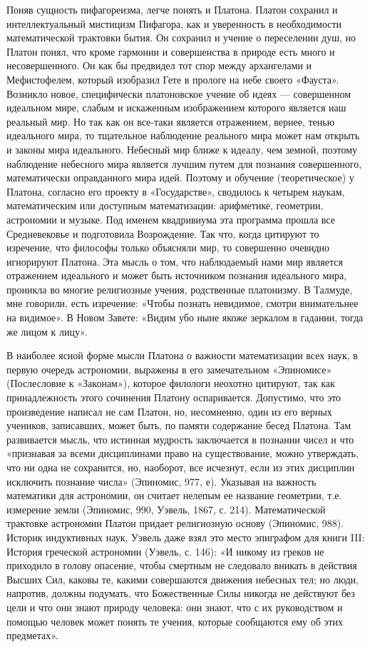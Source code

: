 Поняв сущность пифагореизма, легче понять и Платона. Платон сохранил и
интеллектуальный мистицизм Пифагора, как и уверенность в необходимости
математической  трактовки бытия.  Он сохранил  и учение  о переселении
душ, но Платон понял, что кроме гармонии и совершенства в природе есть
много и несовершенного. Он как бы предвидел тот спор между архангелами
и  Мефистофелем,  который изобразил  Гете  в  прологе на  небе  своего
«Фауста». Возникло  новое, специфически  платоновское учение  об идеях
---  совершенном  идеальном  мире, слабым  и  искаженным  изображением
которого является  наш реальный мир.  Но так как он  все-таки является
отражением, вернее,  тенью идеального  мира, то  тщательное наблюдение
реального мира  может нам открыть  и законы мира  идеального. Небесный
мир  ближе к  идеалу, чем  земной, поэтому  наблюдение небесного  мира
является  лучшим   путем  для  познания   совершенного,  математически
оправданного мира идей. Поэтому  и обучение (теоретическое) у Платона,
согласно  его проекту  в  «Государстве», сводилось  к четырем  наукам,
математическим  или  доступным математизации:  арифметике,  геометрии,
астрономии и музыке.  Под именем квадривиума эта  программа прошла все
Средневековье и  подготовила Возрождение.  Так что, когда  цитируют то
изречение, что  философы только объясняли мир,  то совершенно очевидно
игнорируют Платона. Эта мысль о том, что наблюдаемый нами мир является
отражением  идеального и  может  быть  источником познания  идеального
мира, проникла во многие религиозные учения, родственные платонизму. В
Талмуде,  мне  говорили,  есть изречение:  «Чтобы  познать  невидимое,
смотри внимательнее на видимое». В Новом Завете: «Видим убо ныне якоже
зеркалом в гадании, тогда же лицом к лицу».

В наиболее  ясной форме  мысли Платона  о важности  математизации всех
наук,  в  первую  очередь  астрономии, выражены  в  его  замечательном
«Эпиномисе»  (Послесловие  к  «Законам»),  которое  филологи  неохотно
цитируют, так как принадлежность этого сочинения Платону оспаривается.
Допустимо, что это произведение написал не сам Платон, но, несомненно,
один  из  его  верных  учеников, записавших,  может  быть,  по  памяти
содержание бесед Платона. Там развивается мысль, что истинная мудрость
заключается в  познании чисел и  что «признавая за  всеми дисциплинами
право на существование,  можно утверждать, что ни  одна не сохранится,
но, наоборот, все исчезнут, если  из этих дисциплин исключить познание
числа»  (Эпиномис,  977,  е).  Указывая  на  важность  математики  для
астрономии, он  считает нелепым ее название  геометрии, т.е. измерение
земли (Эпиномис, 990, Уэвель,  1867, с. 214). Математической трактовке
астрономии Платон придает религиозную  основу (Эпиномис, 988). Историк
индуктивных наук, Уэвель даже взял  это место эпиграфом для книги III:
История греческой астрономии (Уэвель, с.  146): «И никому из греков не
приходило в  голову опасение,  чтобы смертным  не следовало  вникать в
действия Высших  Сил, каковы те, какими  совершаются движения небесных
тел; но люди, напротив, должны подумать, что Божественные Силы никогда
не действуют без цели и что они знают природу человека: они знают, что
с их  руководством и помощью  человек может понять те  учения, которые
сообщаются ему об этих предметах».

